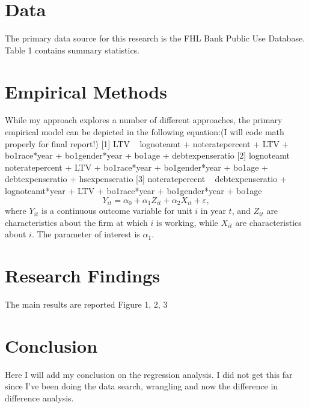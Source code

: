 \documentclass[12pt,english]{article}
\begin{document}
\section{Data}\label{sec:data}
The primary data source for this research is the FHL Bank Public Use Database. Table 1 contains summary statistics.

\section{Empirical Methods}\label{sec:methods}
While my approach explores a number of different approaches, the primary empirical model can be depicted in the following equation:(I will code math properly for final report!)
[1]
LTV ~ lognoteamt + noteratepercent + LTV + bo1race*year + bo1gender*year + bo1age + debtexpenseratio 
[2]
lognoteamt ~ noteratepercent + LTV + bo1race*year + bo1gender*year + bo1age + debtexpenseratio + hsexpenseratio
[3]
noteratepercent ~ debtexpenseratio + lognoteamt*year + LTV + bo1race*year + bo1gender*year + bo1age
\begin{equation}
\label{eq:1}
Y_{it}=\alpha_{0} + \alpha_{1}Z_{it} + \alpha_{2} X_{it} + \varepsilon,
\end{equation}
where $Y_{it}$ is a continuous outcome variable for unit $i$ in year $t$, and $Z_{it}$ are characteristics about the firm at which $i$ is working, while $X_{it}$ are characteristics about $i$. The parameter of interest is $\alpha_{1}$.

\section{Research Findings}\label{sec:results}
The main results are reported Figure 1, 2, 3


\section{Conclusion}\label{secconclusion}
\begin{singlespace}
    Here I will add my conclusion on the regression analysis. I did not get this far since I've been doing the data search, wrangling and now the difference in difference analysis.
\end{singlespace}

\vfill
\pagebreak{}
\begin{spacing}{1.0}


\end{spacing}
\end{document}
